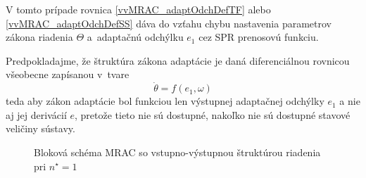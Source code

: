 ﻿\documentclass[a4paper, 10pt, ]{article}
\begin{document}
V tomto prípade rovnica \eqref{vvMRAC_adaptOdchDefTF} alebo \eqref{vvMRAC_adaptOdchDefSS} dáva do vzťahu chybu nastavenia parametrov zákona riadenia $\Theta$ a~adaptačnú odchýlku $e_1$ cez SPR prenosovú funkciu.

Predpokladajme, že štruktúra zákona adaptácie je daná diferenciálnou rovnicou všeobecne zapísanou v~tvare
\begin{equation}
	\dot{\theta} = f(e_1, \omega)
\end{equation}
teda aby zákon adaptácie bol funkciou len výstupnej adaptačnej odchýlky $e_1$ a nie aj jej derivácií $e$, pretože tieto nie sú dostupné, nakoľko nie sú dostupné stavové veličiny sústavy.






\begin{figure}[t]
	\centering


	\caption{Bloková schéma MRAC so vstupno-výstupnou štruktúrou riadenia pri $n^\star = 1$}
	\label{Bloková schéma MRAC so vstupno-výstupnou štruktúrou riadenia}
\end{figure}
\end{document}
